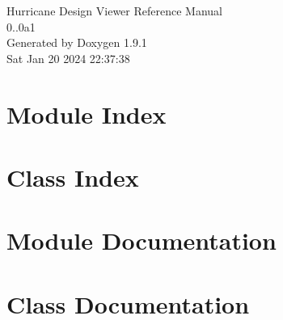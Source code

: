 \documentclass[a4paper]{asimbook}
\begin{document}
   \begin{titlepage}
     \vspace*{7cm}
     \begin{center}
     {\Large Hurricane Design Viewer Reference Manual\\[1ex]\large 0..\+0a1 }\\
     \vspace*{1cm}
     {\large Generated by Doxygen 1.9.1}\\
     \vspace*{0.5cm}
     {\small Sat Jan 20 2024 22:37:38}\\
     \end{center}
   \end{titlepage}

   \clearemptydoublepage

   \tableofcontents
   \clearemptydoublepage

\chapter{Module Index}

\chapter{Class Index}

\chapter{Module Documentation}

\chapter{Class Documentation}








\backmatter
\newpage
{}
\clearemptydoublepage
{}
\printindex
\end{document}
